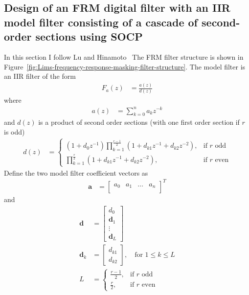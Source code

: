 \documentclass[a4paper,twoside,10pt,english]{report}
\begin{document}
\subsection{\label{sec:FRM-IIR-model-2nd-Order-Cascade}Design of  an FRM digital filter with an IIR model filter consisting of a cascade of second-order sections using SOCP}
In this section I follow Lu and 
Hinamoto~\cite[Section V]{LuHinamoto_IIRFrequencyMaskingFiltersConeProgramming}
The FRM filter structure is shown in 
Figure~\ref{fig:Lims-frequency-response-masking-filter-structure}. The model
filter is an IIR filter of the form
\begin{align*}
F_{a}\left(z\right) &= \frac{a\left(z\right)}{d\left(z\right)}
\end{align*}
where
\begin{align*}
a\left(z\right) &= \sum^{n}_{k=0}a_{k}z^{-k}
\end{align*}
and $d\left(z\right)$ is a product of second order sections (with one first 
order section if $r$ is odd)
\begin{align*}
d\left(z\right) &= \begin{cases}
\left(1+d_{0}z^{-1}\right)
\prod^{\frac{r-1}{2}}_{k=1}\left(1+d_{k1}z^{-1}+d_{k2}z^{-2}\right),
&\text{if $r$ odd}\\
\prod^{\frac{r}{2}}_{k=1}\left(1+d_{k1}z^{-1}+d_{k2}z^{-2}\right),&\text{if $r$ even}
\end{cases}
\end{align*}
Define the two model filter coefficient vectors as
\begin{align*}
\boldsymbol{a}&=\left[\begin{array}{cccc}
a_{0} & a_{1} & \hdots & a_{n}\\
\end{array}\right]^{T}
\end{align*}
and
\begin{align*}
\boldsymbol{d}&=\left[\begin{array}{c}
d_{0}\\
\boldsymbol{d}_{1}\\
\vdots\\
\boldsymbol{d}_{L}
\end{array}\right]\\
\boldsymbol{d}_{k}&=\left[\begin{array}{c}
d_{k1}\\
d_{k2}
\end{array}\right],\quad\text{for } 1\le k\le L\\
L&=\begin{cases}
\frac{r-1}{2},&\text{if $r$ odd}\\
\frac{r}{2},&\text{if $r$ even}
\end{cases}
\end{align*}
\end{document}
